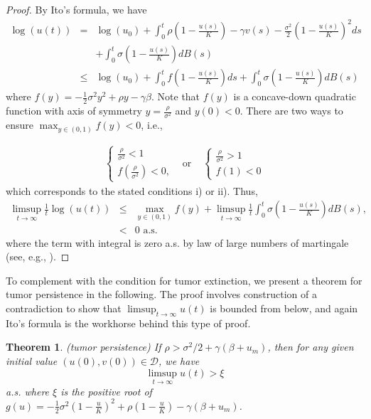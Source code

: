 \documentclass{aims}
\newtheorem{theorem}{Theorem}[section]
\theoremstyle{definition}
\begin{document}
 \begin{proof}
 By Ito's formula, we have 
 \begin{eqnarray*}
 \log(u(t)) & = & \log(u_{0})+\int_{0}^{t}\rho(1-\frac{u(s)}{K})-\gamma v(s)-\frac{\sigma^{2}}{2}(1-\frac{u(s)}{K})^{2}ds\\
  &  & +\int_{0}^{t}\sigma(1-\frac{u(s)}{K})dB(s)\\
  & \le & \log(u_{0})+\int_{0}^{t}f(1-\frac{u(s)}{K})ds+\int_{0}^{t}\sigma(1-\frac{u(s)}{K})dB(s)
 \end{eqnarray*}
 where $f(y)=-\frac{1}{2}\sigma^{2}y^{2}+\rho y-\gamma\beta$. Note that $f(y)$ is a concave-down quadratic function with axis of symmetry $y=\frac{\rho}{\sigma^2}$ and $y(0)<0$. There are two ways to ensure $\max_{y\in(0,1)} f(y)<0$, i.e., 
 
\begin{eqnarray*}
\begin{cases}
\frac{\rho}{\sigma^{2}}<1\\
f(\frac{\rho}{\sigma^{2}})<0,
\end{cases}
 & \text{or \  \ } & \begin{cases}
\frac{\rho}{\sigma^{2}}>1\\
f(1)<0
\end{cases}
\end{eqnarray*} 
which corresponds to the stated conditions i) or ii).
 Thus, 
 \begin{eqnarray*}
 \limsup_{t\to\infty}\frac{1}{t}\log(u(t)) & \le & \max_{y\in(0,1)}f(y)+\limsup_{t\to\infty}\frac{1}{t}\int_{0}^{t}\sigma(1-\frac{u(s)}{K})dB(s),\\
  & < & 0\text{ a.s.}
 \end{eqnarray*}
 where the term with integral is zero a.s. by law of large numbers
 of martingale (see, e.g., \cite{MaoSDEBook}). 
 \end{proof}
 To complement with the condition for tumor extinction, we present
 a theorem for tumor persistence in the following. The proof involves construction of a contradiction to show that $\limsup_{t\to\infty}u(t)$ is bounded from below, and again Ito's formula is the workhorse behind this type of proof. 
 \begin{theorem}
 \label{thm:stoch-persistence}\textup{(tumor persistence)} If $\rho>\sigma^{2}/2+\gamma(\beta+u_{m})$,
 then for any given initial value $(u(0),v(0))\in\mathcal{D}$, we
 have 
 \[
 \limsup_{t\to\infty}u(t)>\xi
 \]
  a.s. where $\xi$ is the positive root of $g(u)=-\frac{1}{2}\sigma^{2}(1-\frac{u}{K})^{2}+\rho(1-\frac{u}{K})-\gamma(\beta+u_{m})$. 
 \end{theorem}
 
\end{document}
